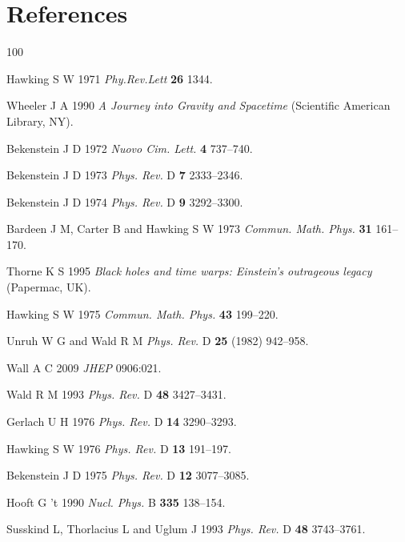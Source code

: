 \documentclass[12pt]{iopart}
\begin{document}
\section*{References}



\begin{thebibliography}{100}

Hawking S W 1971 \textit{Phy.Rev.Lett} \textbf{26} 1344.

Wheeler J A  1990 \textit{A Journey into Gravity and Spacetime} (Scientific American Library, NY).
 
Bekenstein J D  1972  \textit{Nuovo Cim. Lett.} \textbf{4} 737--740.

Bekenstein J D   1973 \textit{Phys. Rev.} D \textbf{7} 2333--2346.

Bekenstein J D 1974  \textit{Phys. Rev.} D \textbf{9}  3292--3300.
 
 
Bardeen J M, Carter  B and Hawking S W 1973  \textit{Commun. Math. Phys.} \textbf{31}  161--170.
 
 Thorne K S 1995 \textit{Black holes and time warps: Einstein's outrageous legacy} (Papermac, UK).
 
Hawking S W  1975 \textit{Commun. Math. Phys.} \textbf{43}   199--220.

Unruh W G and Wald R M   \textit{Phys. Rev.} D \textbf{25} (1982) 942--958.


Wall A C 2009 \textit{JHEP} 0906:021.



Wald R M  1993  \textit{Phys. Rev.} D \textbf{48} 
  3427--3431.
  
 
Gerlach U H  1976 \textit{Phys. Rev.} D \textbf{14}  3290--3293.

Hawking S W  1976  \textit{Phys. Rev.} D \textbf{13}  191--197.

Bekenstein J D 1975  \textit{Phys. Rev.} D \textbf{12}  3077--3085.


Hooft G 't 1990 \textit{Nucl. Phys.} B \textbf{335} 138--154.

Susskind L, Thorlacius L and  Uglum J  1993 \textit{Phys. Rev.} D \textbf{48}  3743--3761.



\end{thebibliography}
\end{document}
